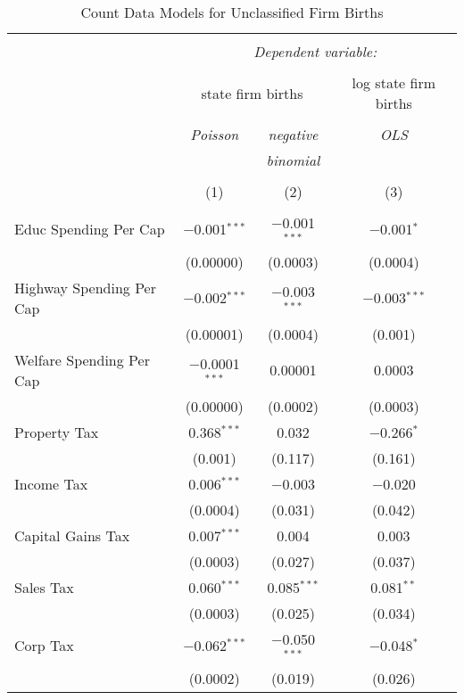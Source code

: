 
\begin{table}[!htbp] \centering 
  \caption{Count Data Models for Unclassified Firm Births} 
  \label{} 
\begin{tabular}{@{\extracolsep{5pt}}lccc} 
\\[-1.8ex]\hline 
\hline \\[-1.8ex] 
 & \multicolumn{3}{c}{\textit{Dependent variable:}} \\ 
\cline{2-4} 
\\[-1.8ex] & \multicolumn{2}{c}{state firm births} & log state firm births \\ 
\\[-1.8ex] & \textit{Poisson} & \textit{negative} & \textit{OLS} \\ 
 & \textit{} & \textit{binomial} & \textit{} \\ 
\\[-1.8ex] & (1) & (2) & (3)\\ 
\hline \\[-1.8ex] 
 Educ Spending Per Cap & $-$0.001$^{***}$ & $-$0.001$^{***}$ & $-$0.001$^{*}$ \\ 
  & (0.00000) & (0.0003) & (0.0004) \\ 
  Highway Spending Per Cap  & $-$0.002$^{***}$ & $-$0.003$^{***}$ & $-$0.003$^{***}$ \\ 
  & (0.00001) & (0.0004) & (0.001) \\ 
  Welfare Spending Per Cap  & $-$0.0001$^{***}$ & 0.00001 & 0.0003 \\ 
  & (0.00000) & (0.0002) & (0.0003) \\ 
  Property Tax & 0.368$^{***}$ & 0.032 & $-$0.266$^{*}$ \\ 
  & (0.001) & (0.117) & (0.161) \\ 
  Income Tax & 0.006$^{***}$ & $-$0.003 & $-$0.020 \\ 
  & (0.0004) & (0.031) & (0.042) \\ 
  Capital Gains Tax & 0.007$^{***}$ & 0.004 & 0.003 \\ 
  & (0.0003) & (0.027) & (0.037) \\ 
  Sales Tax & 0.060$^{***}$ & 0.085$^{***}$ & 0.081$^{**}$ \\ 
  & (0.0003) & (0.025) & (0.034) \\ 
  Corp Tax & $-$0.062$^{***}$ & $-$0.050$^{***}$ & $-$0.048$^{*}$ \\ 
  & (0.0002) & (0.019) & (0.026) \\ 

\end{tabular}
\end{table}
